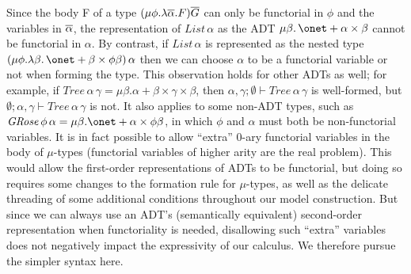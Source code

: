 \documentclass[runningheads]{llncs}
\begin{document}
Since the body F of a type $(\mu \phi. \lambda \overline{\alpha}. F)\overline{G}$
can only be functorial in $\phi$ and the variables in $\overline{\alpha}$,
the representation of $\mathit{List}\,\alpha$ as the ADT $\mu
\beta. \,\onet + \alpha \times \beta$ cannot be functorial in
$\alpha$. By contrast, if $\mathit{List}\,\alpha$ is represented as
the nested type $(\mu \phi. \lambda \beta.\,\onet + \beta \times \phi
\beta)\,\alpha$ then we can choose $\alpha$ to be a functorial
variable or not when forming the type. This observation holds for
other ADTs as well; for example, if $\mathit{Tree}\,\alpha\,\gamma =
\mu \beta. \alpha + \beta \times \gamma \times \beta$, then $\alpha,
\gamma; \emptyset \vdash \mathit{Tree}\,\alpha\,\gamma$ is
well-formed, but $\emptyset; \alpha, \gamma \vdash
\mathit{Tree}\,\alpha\,\gamma$ is not. It also applies to some non-ADT
types, such as $\mathit{GRose}\,\phi\,\alpha = \mu \beta. \onet +
\alpha \times \phi\beta$, in which $\phi$ and $\alpha$ must both be
non-functorial variables.  It is in fact possible to allow ``extra''
$0$-ary functorial variables in the body of $\mu$-types (functorial
variables of higher arity are the real problem). This would allow the
first-order representations of ADTs to be functorial, but doing so
requires some changes to the formation rule for $\mu$-types, as well
as the delicate threading of some additional conditions throughout our
model construction.  But since we can always use an ADT's
(semantically equivalent) second-order representation when
functoriality is needed, disallowing such ``extra'' variables does not
negatively impact the expressivity of our calculus. We therefore
pursue the simpler syntax here.
\end{document}
